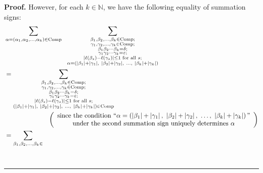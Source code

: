 \documentclass[numbers=enddot,12pt,final,onecolumn,notitlepage]{scrartcl}%
\theoremstyle{definition}
\newenvironment{proof}[1][Proof]{\noindent\textbf{#1.} }{\ \rule{0.5em}{0.5em}}
\let\sumnonlimits\sum
\renewcommand{\sum}{\sumnonlimits\limits}
\begin{document}
\begin{proof}
However, for each $k\in\mathbb{N}$, we have the following equality of
summation signs:%
\begin{align*}
&  \sum_{\alpha=\left(  \alpha_{1},\alpha_{2},\ldots,\alpha_{k}\right)
\in\operatorname*{Comp}}\ \ \sum_{\substack{\beta_{1},\beta_{2},\ldots
,\beta_{k}\in\operatorname*{Comp};\\\gamma_{1},\gamma_{2},\ldots,\gamma_{k}%
\in\operatorname*{Comp};\\\beta_{1}\beta_{2}\cdots\beta_{k}=\delta
;\\\gamma_{1}\gamma_{2}\cdots\gamma_{k}=\varepsilon;\\\left\vert \ell\left(
\beta_{s}\right)  -\ell\left(  \gamma_{s}\right)  \right\vert \leq1\text{ for
all }s;\\\alpha=\left(  \left\vert \beta_{1}\right\vert +\left\vert \gamma
_{1}\right\vert ,\ \left\vert \beta_{2}\right\vert +\left\vert \gamma
_{2}\right\vert ,\ \ldots,\ \left\vert \beta_{k}\right\vert +\left\vert
\gamma_{k}\right\vert \right)  }}\\
&  =\sum_{\substack{\beta_{1},\beta_{2},\ldots,\beta_{k}\in
\operatorname*{Comp};\\\gamma_{1},\gamma_{2},\ldots,\gamma_{k}\in
\operatorname*{Comp};\\\beta_{1}\beta_{2}\cdots\beta_{k}=\delta;\\\gamma
_{1}\gamma_{2}\cdots\gamma_{k}=\varepsilon;\\\left\vert \ell\left(  \beta
_{s}\right)  -\ell\left(  \gamma_{s}\right)  \right\vert \leq1\text{ for all
}s;\\\left(  \left\vert \beta_{1}\right\vert +\left\vert \gamma_{1}\right\vert
,\ \left\vert \beta_{2}\right\vert +\left\vert \gamma_{2}\right\vert
,\ \ldots,\ \left\vert \beta_{k}\right\vert +\left\vert \gamma_{k}\right\vert
\right)  \in\operatorname*{Comp}}}\\
&  \ \ \ \ \ \ \ \ \ \ \ \ \ \ \ \ \ \ \ \ \left(
\begin{array}
[c]{c}%
\text{since the condition \textquotedblleft}\alpha=\left(  \left\vert
\beta_{1}\right\vert +\left\vert \gamma_{1}\right\vert ,\ \left\vert \beta
_{2}\right\vert +\left\vert \gamma_{2}\right\vert ,\ \ldots,\ \left\vert
\beta_{k}\right\vert +\left\vert \gamma_{k}\right\vert \right)
\text{\textquotedblright}\\
\text{under the second summation sign uniquely determines }\alpha
\end{array}
\right) \\
&  =\sum_{\substack{\beta_{1},\beta_{2},\ldots,\beta_{k}\in
}}
\end{align*}
\end{proof}
\end{document}
